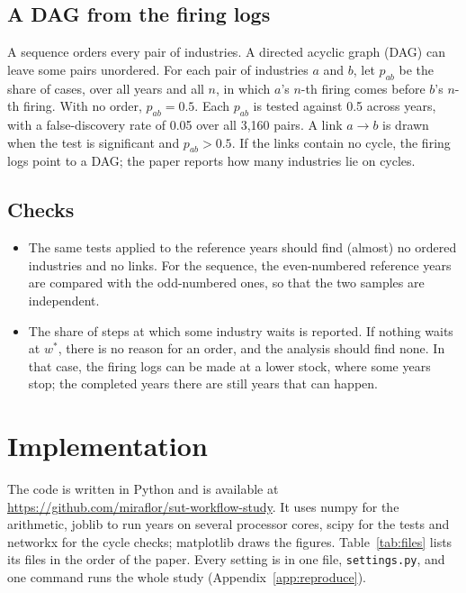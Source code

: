\documentclass[11pt]{article}
\begin{document}
\subsection{A DAG from the firing logs}

A sequence orders every pair of industries. A directed acyclic graph (DAG) can leave some pairs unordered. For each pair of industries $a$ and $b$, let $p_{ab}$ be the share of cases, over all years and all $n$, in which $a$'s $n$-th firing comes before $b$'s $n$-th firing. With no order, $p_{ab}=0.5$. Each $p_{ab}$ is tested against 0.5 across years, with a false-discovery rate of 0.05 over all 3{,}160 pairs. A link $a\to b$ is drawn when the test is significant and $p_{ab}>0.5$. If the links contain no cycle, the firing logs point to a DAG; the paper reports how many industries lie on cycles.

\subsection{Checks}

\begin{itemize}[leftmargin=*]
\item The same tests applied to the reference years should find (almost) no ordered industries and no links. For the sequence, the even-numbered reference years are compared with the odd-numbered ones, so that the two samples are independent.
\item The share of steps at which some industry waits is reported. If nothing waits at $w^*$, there is no reason for an order, and the analysis should find none. In that case, the firing logs can be made at a lower stock, where some years stop; the completed years there are still years that can happen.
\end{itemize}

\section{Implementation}\label{sec:code}

The code is written in Python and is available at \url{https://github.com/miraflor/sut-workflow-study}. It uses numpy for the arithmetic, joblib to run years on several processor cores, scipy for the tests and networkx for the cycle checks; matplotlib draws the figures. Table~\ref{tab:files} lists its files in the order of the paper. Every setting is in one file, \texttt{settings.py}, and one command runs the whole study (Appendix~\ref{app:reproduce}).
\end{document}
